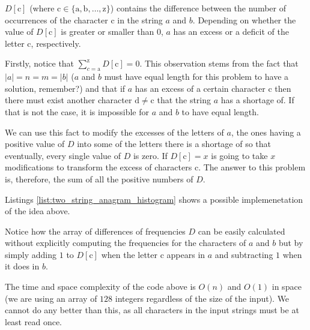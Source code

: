 $D[\mathrm{c}]$ (where $\mathrm{c} \in \{\mathrm{a},\mathrm{b},\ldots,\mathrm{z}\}$) contains the difference between the number of occurrences of the character $\mathrm{c}$ in the string $a$ and $b$. Depending on whether the value of $D[\mathrm{c}]$  is greater or smaller than $0$, $a$ has an excess or a deficit of the letter c, respectively.

Firstly, notice that $\sum_{c=\mathrm{a}}^{\mathrm{z}} D[\mathrm{c}] = 0$. This observation stems from the fact that $|a|=n=m=|b|$ ($a$ and $b$ must have equal length for this problem to have a solution, remember?) and that if $a$ has an excess of a certain character $\mathrm{c}$ then there must exist another character $\mathrm{d} \neq \mathrm{c}$ that the string $a$ has a shortage of. If that is not the case, it is impossible for $a$ and $b$ to have equal length.

We can use this fact to modify the excesses of the letters of $a$, the ones having a positive value of $D$ into some of the letters there is a shortage of so that eventually, every single value of $D$ is zero.
If $D[\mathrm{c}] = x$ is going to take $x$ modifications to transform the excess of characters $\mathrm{c}$.
The answer to this problem is, therefore, the sum of all the positive numbers of $D$. 

Listings \ref{list:two_string_anagram_histogram} shows a possible implemenetation of the idea above.



Notice how the array of differences of frequencies $D$ can be easily calculated without explicitly
computing the frequencies for the characters of $a$ and $b$ but by simply adding $1$ to $D[\mathrm{c}]$ when the letter $\mathrm{c}$ appears in $a$
and subtracting $1$ when it does in $b$. 

The time and space complexity of the code above is $O(n)$ and $O(1)$ in space (we are using an array of $128$ integers regardless of the size of the input). We cannot do any better than this, as all characters in the input strings must be at least read once.



